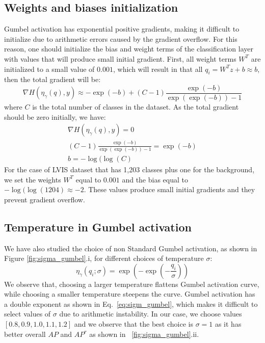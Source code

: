 \documentclass[runningheads]{llncs}
\begin{document}
\subsection{Weights and biases initialization}
Gumbel activation has exponential positive gradients, making it difficult to initialize due to arithmetic errors caused by the gradient overflow. For this reason, one should initialize the bias and weight terms of the classification layer with values that will produce small initial gradient. First, all weight terms $W^T$ are initialized to a small value of $0.001$, which will result in that all $q_i=W^Tz+b \approx b$, then the total gradient will be:
\begin{equation}
    \nabla H(\eta_{\gamma}(q),y)\approx -\exp(-b)+(C-1)\frac{\exp(-b)}{\exp(\exp(-b))-1}
    \label{eq:weight_int_1}
\end{equation}
where $C$ is the total number of classes in the dataset. As the total gradient should be zero initially, we have:
\begin{equation}
    \begin{aligned}
     \nabla H(\eta_\gamma(q),y)=0 \\
  (C-1)\frac{\exp(-b)}{\exp(\exp(-b))-1}=\exp(-b) \\
  b=-\log(\log(C)
  \end{aligned}
    \label{eq:weight_int_2}
\end{equation}
For the case of LVIS dataset that has 1,203 classes plus one for the background, we set the weights $W^T$ equal to $0.001$ and the bias equal to $-\log(\log(1204)\approx -2$. These values produce small initial gradients and they prevent gradient overflow.

\subsection{Temperature in Gumbel activation}
We have also studied the choice of non Standard Gumbel activation, as shown in Figure \ref{fig:sigma_gumbel}.i, for different choices of temperature $\sigma$:
\begin{equation}
    \eta_{\gamma}(q_i;\sigma)=\exp(-\exp(-\frac{q_i}{\sigma}))
    \label{eq:sigm_gumbel}
\end{equation}
We observe that, choosing a larger temperature flattens Gumbel activation curve, while choosing a smaller temperature steepens the curve.
Gumbel activation has a double exponent as shown in Eq.~\ref{eq:sigm_gumbel}, which makes it difficult to select values of $\sigma$ due to arithmetic instability. In our case, we choose values $[0.8,0.9,1.0,1.1,1.2]$ and we observe that the best choice is  $\sigma=1$ as it has better overall $AP$ and $AP^r$ as shown in ~\ref{fig:sigma_gumbel}.ii.
\end{document}
